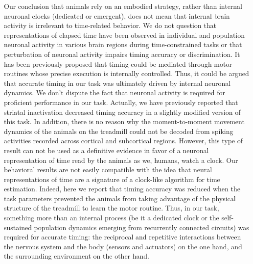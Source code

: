 \par
Our conclusion that animals rely on an embodied strategy, rather than internal neuronal clocks (dedicated or emergent), does not mean that internal brain activity is irrelevant to time-related behavior.
We do not question that representations of elapsed time have been observed in individual and population neuronal activity in various brain regions during time-constrained tasks or that perturbation of neuronal activity impairs timing accuracy or discrimination.
It has been previously proposed that timing could be mediated through motor routines whose precise execution is internally controlled\cite{Killeen1988,Dragoi2003, Staddon1999,Machado1997}.
Thus, it could be argued that accurate timing in our task was ultimately driven by internal neuronal dynamics.
We don't dispute the fact that neuronal activity is required for proficient performance in our task.
Actually, we have previously reported that striatal inactivation decreased timing accuracy in a slightly modified version of this task\cite{Rueda2015NatNeuro}.
In addition, there is no reason why the moment-to-moment movement dynamics of the animals on the treadmill could not be decoded from spiking activities recorded across cortical and subcortical regions.
However, this type of result can not be used as a definitive evidence in favor of a neuronal representation of time read by the animals as we, humans, watch a clock\cite{Krakauer2017Neuron, Buzsaki2017Science, Buzsaki2018TICS}.
Our behavioral results are not easily compatible with the idea that neural representations of time are a signature of a clock-like algorithm for time estimation.
Indeed, here we report that timing accuracy was reduced when the task parameters prevented the animals from taking advantage of the physical structure of the treadmill to learn the motor routine.
Thus, in our task, something more than an internal process (be it a dedicated clock or the self-sustained population dynamics emerging from recurrently connected circuits)  was required for accurate timing:
the reciprocal and repetitive interactions between the nervous system and the body (sensors and actuators) on the one hand, and the surrounding environment on the other hand.
